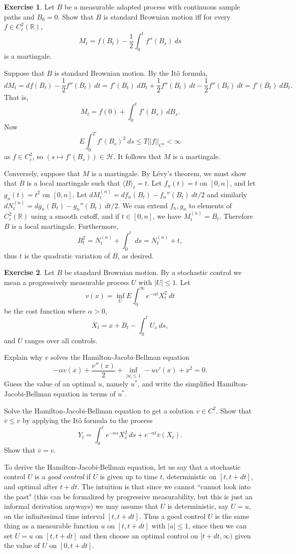 \documentclass[10pt]{article}
\newcommand{\RR}{\mathbb{R}}
\theoremstyle{definition}
\newtheorem{exer}{Exercise}
\begin{document}
\begin{exer}
Let $B$ be a measurable adapted process with continuous sample paths and $B_0 = 0$.
Show that $B$ is standard Brownian motion iff for every $f \in C^2_c(\RR)$,
$$M_t = f(B_t) - \frac{1}{2} \int_0^t f''(B_s) ~ds$$
is a martingale.
\end{exer}

Suppose that $B$ is standard Brownian motion.
By the It\^o formula,
$$dM_t = df(B_t) - \frac{1}{2} f''(B_t) ~dt = f'(B_t) ~dB_t + \frac{1}{2} f''(B_t) ~dt - \frac{1}{2} f''(B_t) ~dt = f'(B_t) ~dB_t.$$
That is,
$$M_t = f(0) + \int_0^t f'(B_s) ~dB_s.$$
Now
$$E\int_0^T f'(B_s)^2 ~ds \leq T||f||_{C^2} < \infty$$
as $f \in C^2_c$, so $(s \mapsto f'(B_s)) \in \mathcal H$.
It follows that $M$ is a martingale.

Conversely, suppose that $M$ is a martingale.
By L\'evy's theorem, we must show that $B$ is a local martingale such that $\langle B\rangle_t = t$.
Let $f_n(t) = t$ on $[0, n]$, and let $g_n(t) = t^2$ on $[0, n]$.
Let $dM^{(n)}_t = df_n(B_t) - f_n''(B_t) ~dt/2$ and similarly $dN^{(n)}_t = dg_n(B_t) - g_n''(B_t) ~dt/2$.
We can extend $f_n,g_n$ to elements of $C^2_c(\RR)$ using a smooth cutoff, and if $t \in [0, n]$, we have $M^{(n)}_t = B_t$.
Therefore $B$ is a local martingale.
Furthermore,
$$B_t^2 = N^{(n)}_t + \int_0^t ~ds = N^{(n)}_t + t,$$
thus $t$ is the quadratic variation of $B$, as desired.

\begin{exer}
Let $B$ be standard Brownian motion.
By a stochastic control we mean a progressively measurable process $U$ with $|U| \leq 1$.
Let
$$v(x) = \inf_U E\int_0^\infty e^{-\alpha t} X_t^2 ~dt$$
be the cost function where $\alpha > 0$,
$$X_t = x + B_t - \int_0^t U_s ~ds,$$
and $U$ ranges over all controls.

Explain why $v$ solves the Hamilton-Jacobi-Bellman equation
$$-\alpha v(x) + \frac{v''(x)}{2} + \inf_{|u| \leq 1} -uv'(x) + x^2 = 0.$$
Guess the value of an optimal $u$, namely $u^*$, and write the simplified Hamilton-Jacobi-Bellman equation in terms of $u^*$.

Solve the Hamilton-Jacobi-Bellman equation to get a solution $\overline v \in C^2$.
Show that $\overline v \leq v$ by applying the It\^o formula to the process
$$Y_t = \int_0^t e^{-\alpha s} X_s^2 ~ds + e^{-\alpha t} \overline v(X_t).$$
Show that $\overline v = v$.
\end{exer}

To derive the Hamilton-Jacobi-Bellman equation, let us say that a stochastic control $U$ is a \emph{good control} if $U$ is given up to time $t$, deterministic on $[t, t + dt]$, and optimal after $t + dt$.
The intuition is that since we cannot ``cannot look into the past" (this can be formalized by progressive measurability, but this is just an informal derivation anyways) we may assume that $U$ is deterministic, say $U = u$, on the infinitesimal time interval $[t, t + dt]$.
Thus a good control $U$ is the same thing as a measurable function $u$ on $[t, t + dt]$ with $|u| \leq 1$, since then we can set $U = u$ on $[t, t + dt]$ and then choose an optimal control on $[t + dt, \infty)$ given the value of $U$ on $[0, t + dt]$.
\end{document}
